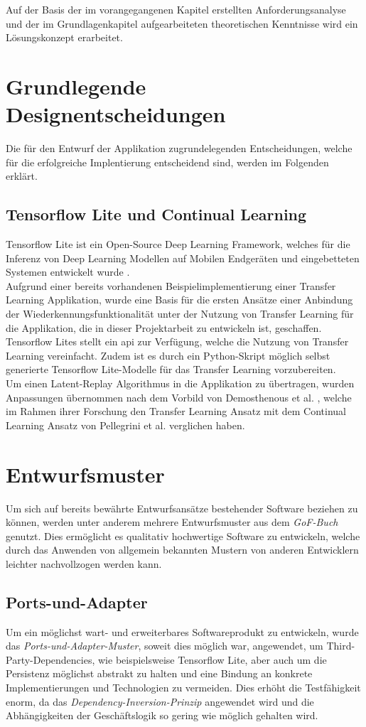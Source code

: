 \documentclass[oneside]{ausarbeitung}
\begin{document}
\label{cha:Entwurf}
Auf der Basis der im vorangegangenen Kapitel erstellten Anforderungsanalyse 
und der im Grundlagenkapitel aufgearbeiteten theoretischen Kenntnisse 
wird ein Lösungskonzept erarbeitet.
\section{Grundlegende Designentscheidungen}
Die für den Entwurf der Applikation zugrundelegenden Entscheidungen, welche für die erfolgreiche Implentierung entscheidend sind, werden im Folgenden erklärt.
\subsection{Tensorflow Lite und Continual Learning}
Tensorflow Lite ist ein Open-Source Deep Learning Framework, welches für die Inferenz von Deep Learning Modellen auf Mobilen Endgeräten und eingebetteten Systemen entwickelt wurde \cite{tflite-site}.\\
Aufgrund einer bereits vorhandenen Beispielimplementierung einer Transfer Learning Applikation, wurde eine Basis für die ersten Ansätze einer Anbindung der Wiederkennungsfunktionalität unter der Nutzung von Transfer Learning für die Applikation, die in dieser Projektarbeit zu entwickeln ist, geschaffen.
Tensorflow Lites stellt ein \ac{api} zur Verfügung, welche die Nutzung von Transfer Learning vereinfacht. Zudem ist es durch ein Python-Skript möglich selbst generierte Tensorflow Lite-Modelle für das Transfer Learning vorzubereiten.\\
Um einen Latent-Replay Algorithmus in die Applikation zu übertragen, wurden Anpassungen übernommen nach dem Vorbild von Demosthenous et al. \cite{cl-vs-tl}, welche im Rahmen ihrer Forschung den Transfer Learning Ansatz mit dem Continual Learning Ansatz von Pellegrini et al. \cite{Pellegrini2019} verglichen haben.
\section{Entwurfsmuster}
Um sich auf bereits bewährte Entwurfsansätze bestehender Software beziehen zu können, werden unter anderem mehrere Entwurfsmuster aus dem \textit{GoF-Buch} genutzt. Dies ermöglicht es qualitativ hochwertige Software zu entwickeln, welche durch das Anwenden von allgemein bekannten Mustern von anderen Entwicklern leichter nachvollzogen werden kann.
\subsection{Ports-und-Adapter}
Um ein möglichst wart- und erweiterbares Softwareprodukt zu entwickeln, wurde das \textit{Ports-und-Adapter-Muster}, soweit dies möglich war, angewendet, um Third-Party-Dependencies, wie beispielsweise Tensorflow Lite, aber auch um die Persistenz möglichst abstrakt zu halten und eine Bindung an konkrete Implementierungen und Technologien zu vermeiden. Dies erhöht die Testfähigkeit enorm, da das \textit{Dependency-Inversion-Prinzip} angewendet wird und die Abhängigkeiten der Geschäftslogik so gering wie möglich gehalten wird.
\end{document}
